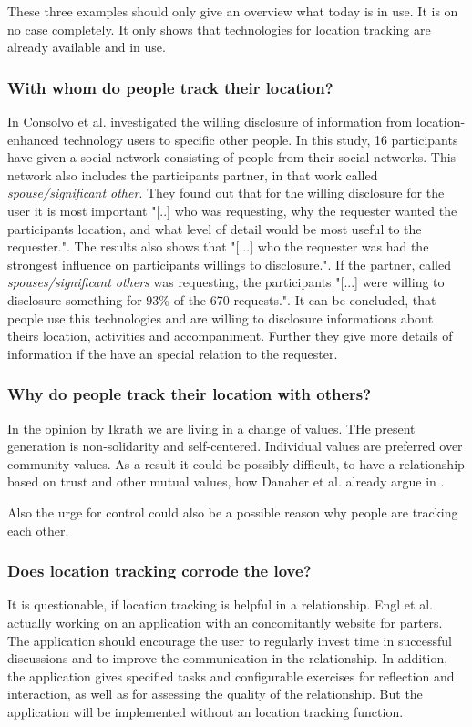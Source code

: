 These three examples should only give an overview what today is in use. It is on no case completely. It only shows that technologies for location tracking are already available and in use.

\subsubsection{With whom do people track their location?}
In \cite{Consolvo:2005:LDS:1054972.1054985} Consolvo et al. investigated the willing disclosure of information from location-enhanced technology users to specific other people. In this study, 16 participants have given a social network consisting of people from their social networks. This network also includes the participants partner, in that work called \textit{spouse/significant other}. They found out that for the willing disclosure for the user it is most important "[..] who was requesting, why the requester wanted the participants location, and what level of detail would be most useful to the requester.". The results also shows that "[...] who the requester was had the strongest influence on participants willings to disclosure.". If the partner, called \textit{spouses/significant others} was requesting, the participants "[...] were willing to disclosure something for 93\% of the 670 requests.".
It can be concluded, that people use this technologies and are willing to disclosure informations about theirs location, activities and accompaniment. Further they give more details of information if the have an special relation to the requester.

\subsubsection{Why do people track their location with others?}

In the opinion by Ikrath \cite{Ikrath2018} we are living in a change of values. THe present generation is non-solidarity and self-centered. Individual values are preferred over community values.  
As a result it could be possibly difficult, to have a relationship based on trust and other mutual values, how Danaher et al. already argue in \cite{doi:10.1080/15265161.2017.1409823}.

Also the urge for control could also be a possible reason why people are tracking each other.

\subsubsection{Does location tracking corrode the love?}
It is questionable, if location tracking is helpful in a relationship.
Engl et al. \cite{engl2016} actually working on an application with an concomitantly website for parters.
The application should encourage the user to regularly invest time in successful discussions and to improve the communication in the relationship.
In addition, the application gives specified tasks and configurable exercises for reflection and interaction, as well as for assessing the quality of the relationship.
But the application will be implemented without an location tracking function.

